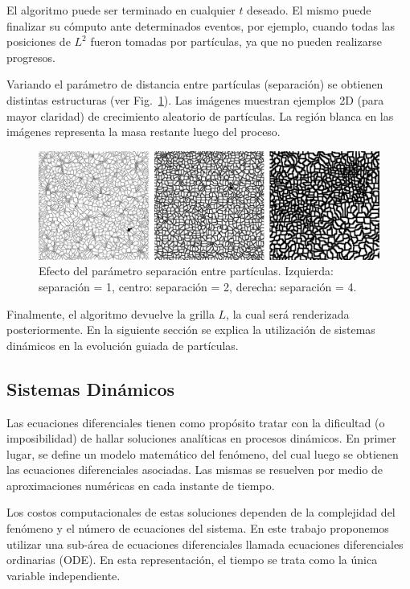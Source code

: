 El algoritmo puede ser terminado en cualquier $t$ deseado. El mismo puede finalizar su c\'omputo ante determinados eventos, por ejemplo, cuando todas las posiciones de $L^{2}$ fueron tomadas por part\'iculas, ya que no pueden realizarse progresos.

Variando el par\'ametro de distancia entre part\'iculas (separación) se obtienen distintas estructuras (ver Fig.~\ref{fg:sistdin1}). Las im\'agenes muestran ejemplos 2D (para mayor claridad) de crecimiento aleatorio de part\'iculas. La regi\'on blanca en las im\'agenes representa la masa restante luego del proceso.


\begin{figure}[htb!]
  \centerline{\includegraphics[width=13cm]{figures/Fig1}}
  \caption[Efecto del parámetro separación entre partículas.]{Efecto del parámetro separación entre partículas. Izquierda: separaci\'on = 1, centro: separaci\'on = 2, derecha: separaci\'on = 4.}
  \label{fg:sistdin1}
\end{figure}

Finalmente, el algoritmo devuelve la grilla $L$, la cual ser\'a renderizada posteriormente. En la siguiente secci\'on se explica la utilizaci\'on de sistemas din\'amicos en la evoluci\'on guiada de part\'iculas.

\subsection{Sistemas Din\'amicos}

Las ecuaciones diferenciales tienen como prop\'osito tratar con la dificultad (o imposibilidad) de hallar soluciones anal\'iticas en procesos din\'amicos.
En primer lugar, se define un modelo matem\'atico del fenómeno, del cual luego se obtienen 
las ecuaciones diferenciales asociadas. Las mismas se resuelven por medio de aproximaciones num\'ericas en cada instante de tiempo.

Los costos computacionales de estas soluciones dependen de la complejidad del fenómeno y el n\'umero de ecuaciones del sistema. En este trabajo proponemos utilizar una sub-\'area de ecuaciones diferenciales llamada ecuaciones diferenciales ordinarias (ODE). En esta representaci\'on, el tiempo se trata como la \'unica variable independiente.


